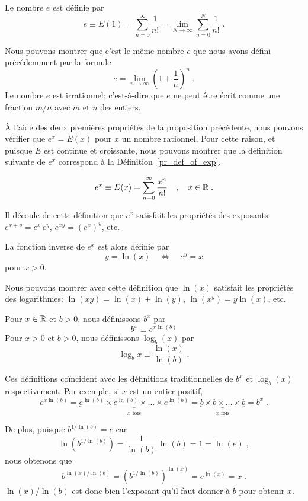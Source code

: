 {\begin{focus}{\dfn}
Le nombre $e$ est définie par
\[
e \equiv E(1) = \sum_{n=0}^\infty \frac{1}{n!}
= \lim_{N\rightarrow \infty} \sum_{n=0}^N \frac{1}{n!} \; .
\]
\end{focus}

Nous pouvons montrer que c'est le même nombre $e$ que nous avons
défini précédemment par la formule
\[
e = \lim_{n\rightarrow \infty} \left(1+\frac{1}{n}\right)^n \; .
\]
Le nombre $e$ est irrationnel; c'est-à-dire que $e$ ne peut être écrit comme
une fraction $m/n$ avec $m$ et $n$ des entiers.

À l'aide des deux premières propriétés de la proposition précédente,
nous pouvons vérifier que $e^x = E(x)$ pour $x$ un nombre rationnel,
Pour cette raison,
et puisque $E$ est continue et croissante, nous pouvons montrer que la
définition suivante de $e^x$ correspond à la Définition~\ref{pr_def_of_exp}.

\begin{focus}{\dfn}
\[
e^x \equiv E(x) = \sum_{n=0}^\infty \frac{x^n}{n!} \quad , \quad x \in \mathbb{R} \; .
\]
\end{focus}

Il découle de cette définition que $e^x$ satisfait les propriétés des
exposants: $e^{x+y} = e^x\, e^y$, $e^{xy} = (e^x)^y$, etc.

\begin{focus}{\dfn}
La fonction inverse de $e^x$ est alors définie par
\[
y = \ln (x) \quad \Leftrightarrow \quad e^y=x
\]
pour $x>0$.
\end{focus}

Nous pouvons montrer avec cette définition que $\ln(x)$ satisfait les
propriétés des logarithmes:
$\ln(xy) = \ln(x)+\ln(y)$, $\ln(x^y) = y\ln(x)$, etc.

\begin{focus}{\dfn}
Pour $x\in \mathbb{R}$ et $b>0$, nous définissons $b^x$ par
\[
b^x \equiv e^{x\ln(b)}
\]
Pour $x > 0$ et $b>0$, nous définissons $\log_b(x)$ par
\[
\log_b{x} \equiv \frac{\ln(x)}{\ln(b)} \; .
\]
\end{focus}

Ces définitions coïncident avec les définitions traditionnelles de $b^x$ et
$\log_b(x)$ respectivement.  Par exemple, si $x$ est un entier positif,
\[
e^{x\ln(b)} = \underbrace{e^{\ln(b)} \times e^{\ln(b)} \times
  \ldots \times e^{\ln(b)}}_{x \text{ fois}}
= \underbrace{b \times b \times \ldots \times b}_{x \text{ fois}}
= b^x \; .
\]

De plus, puisque $\displaystyle b^{1/\ln(b)} = e$ car
\[
\ln( b^{1/\ln(b)} ) = \frac{1}{\ln(b)} \, \ln(b) = 1 = \ln(e) \;,
\]
nous obtenons que
\[
b^{\ln(x)/\ln(b)} = \left(b^{1/\ln(b)}\right)^{\ln(x)}
= e^{\ln(x)} = x \; .
\]
$\ln(x)/\ln(b)$ est donc bien l'exposant qu'il faut donner à $b$ pour obtenir
$x$.

}
